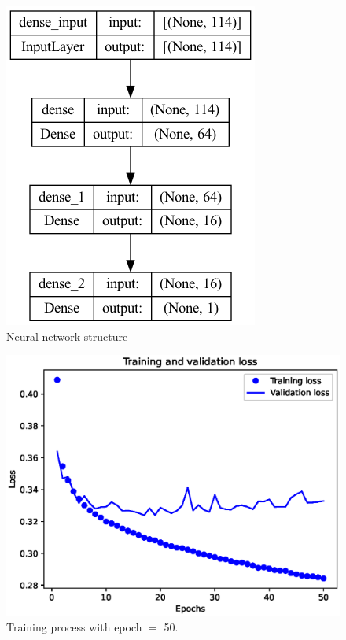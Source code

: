\documentclass[11pt, a4paper, jou]{apa7}
\begin{document}
\begin{table}[h]
    \centering
    \caption{SVM with gaussian kernel function and using PCA summary}
    \label{tab:SVM_gauss_PCA_summary}
\end{table}

\begin{figure}[h]
    \centering
    \caption{Neural network structure}\label{fig:NN}
    \includegraphics[width=.3\textwidth]{figures/Network_structure.png}
\end{figure}

\begin{figure}[h]
    \centering
    \caption{Training process with epoch $=$ 50. }\label{fig:NN_process_50}
    \includegraphics[width=.45\textwidth]{figures/error_50.eps}
\end{figure}
\end{document}
